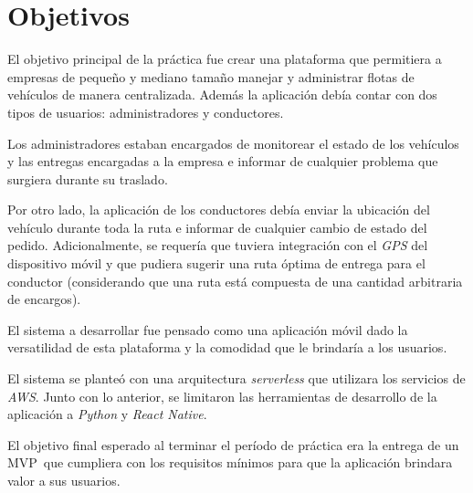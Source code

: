 \section{Objetivos}
  El objetivo principal de la práctica fue crear una plataforma que permitiera a empresas
  de pequeño y mediano tamaño manejar y administrar flotas de vehículos de manera
  centralizada.
  Además la aplicación debía contar con dos tipos de usuarios: administradores y 
  conductores.

  Los administradores estaban encargados de monitorear el estado de los vehículos y las
  entregas encargadas a la empresa e informar de cualquier problema que surgiera durante
  su traslado.

  Por otro lado, la aplicación de los conductores debía enviar la ubicación del vehículo
  durante toda la ruta e informar de cualquier cambio de estado del pedido.
  Adicionalmente, se requería que tuviera integración con el \textit{GPS} del dispositivo 
  móvil y que pudiera sugerir una ruta óptima de entrega para el conductor (considerando 
  que una ruta está compuesta de una cantidad arbitraria de encargos).

  El sistema a desarrollar fue pensado como una aplicación móvil dado la versatilidad de
  esta plataforma y la comodidad que le brindaría a los usuarios.

  El sistema se planteó con una arquitectura \textit{serverless} que utilizara los
  servicios de \textit{AWS}\footnotemark.
  Junto con lo anterior, se limitaron las herramientas de desarrollo de la aplicación a
  \textit{Python} y \textit{React Native}.

  El objetivo final esperado al terminar el período de práctica era la entrega de un 
  MVP\footnotemark\ que cumpliera con los requisitos mínimos para que la aplicación
  brindara valor a sus usuarios.
  \vfill
%